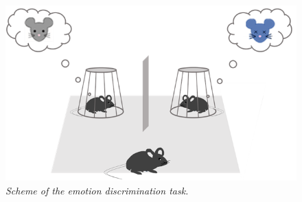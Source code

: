 \documentclass[11pt,a4paper,twocolumn]{article}
\begin{document}
\begin{figure}[H]
	\begin{center}
		\includegraphics[scale=.4]{emotion_discrimination.png} 
	\end{center} 
	\caption{\textit{Scheme of the emotion discrimination task.}} \label{emotion}
	
\end{figure}
\end{document}
